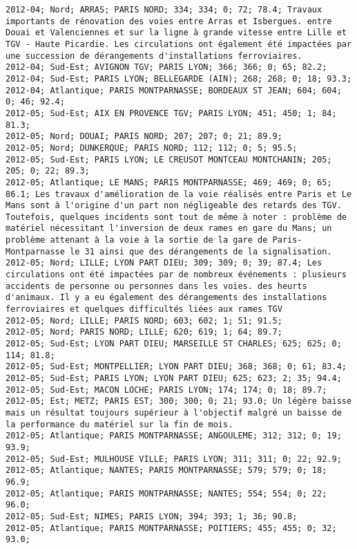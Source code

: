 \documentclass{article}
\begin{document}
\begin{Verbatim}[commandchars=\\\{\}]
2012-04; Nord; ARRAS; PARIS NORD; 334; 334; 0; 72; 78.4; Travaux importants de rénovation des voies entre Arras et Isbergues. entre Douai et Valenciennes et sur la ligne à grande vitesse entre Lille et TGV - Haute Picardie. Les circulations ont également été impactées par une succession de dérangements d'installations ferroviaires.
2012-04; Sud-Est; AVIGNON TGV; PARIS LYON; 366; 366; 0; 65; 82.2; 
2012-04; Sud-Est; PARIS LYON; BELLEGARDE (AIN); 268; 268; 0; 18; 93.3; 
2012-04; Atlantique; PARIS MONTPARNASSE; BORDEAUX ST JEAN; 604; 604; 0; 46; 92.4; 
2012-05; Sud-Est; AIX EN PROVENCE TGV; PARIS LYON; 451; 450; 1; 84; 81.3; 
2012-05; Nord; DOUAI; PARIS NORD; 207; 207; 0; 21; 89.9; 
2012-05; Nord; DUNKERQUE; PARIS NORD; 112; 112; 0; 5; 95.5; 
2012-05; Sud-Est; PARIS LYON; LE CREUSOT MONTCEAU MONTCHANIN; 205; 205; 0; 22; 89.3; 
2012-05; Atlantique; LE MANS; PARIS MONTPARNASSE; 469; 469; 0; 65; 86.1; Les travaux d'amélioration de la voie réalisés entre Paris et Le Mans sont à l'origine d'un part non négligeable des retards des TGV. Toutefois, quelques incidents sont tout de même à noter : problème de matériel nécessitant l'inversion de deux rames en gare du Mans; un problème attenant à la voie à la sortie de la gare de Paris-Montparnasse le 31 ainsi que des dérangements de la signalisation.
2012-05; Nord; LILLE; LYON PART DIEU; 309; 309; 0; 39; 87.4; Les circulations ont été impactées par de nombreux événements : plusieurs accidents de personne ou personnes dans les voies. des heurts d'animaux. Il y a eu également des dérangements des installations ferroviaires et quelques difficultés liées aux rames TGV
2012-05; Nord; LILLE; PARIS NORD; 603; 602; 1; 51; 91.5; 
2012-05; Nord; PARIS NORD; LILLE; 620; 619; 1; 64; 89.7; 
2012-05; Sud-Est; LYON PART DIEU; MARSEILLE ST CHARLES; 625; 625; 0; 114; 81.8; 
2012-05; Sud-Est; MONTPELLIER; LYON PART DIEU; 368; 368; 0; 61; 83.4; 
2012-05; Sud-Est; PARIS LYON; LYON PART DIEU; 625; 623; 2; 35; 94.4; 
2012-05; Sud-Est; MACON LOCHE; PARIS LYON; 174; 174; 0; 18; 89.7; 
2012-05; Est; METZ; PARIS EST; 300; 300; 0; 21; 93.0; Un légère baisse mais un résultat toujours supérieur à l'objectif malgré un baisse de la performance du matériel sur la fin de mois.
2012-05; Atlantique; PARIS MONTPARNASSE; ANGOULEME; 312; 312; 0; 19; 93.9; 
2012-05; Sud-Est; MULHOUSE VILLE; PARIS LYON; 311; 311; 0; 22; 92.9; 
2012-05; Atlantique; NANTES; PARIS MONTPARNASSE; 579; 579; 0; 18; 96.9; 
2012-05; Atlantique; PARIS MONTPARNASSE; NANTES; 554; 554; 0; 22; 96.0; 
2012-05; Sud-Est; NIMES; PARIS LYON; 394; 393; 1; 36; 90.8; 
2012-05; Atlantique; PARIS MONTPARNASSE; POITIERS; 455; 455; 0; 32; 93.0; 

\end{Verbatim}
\end{document}
